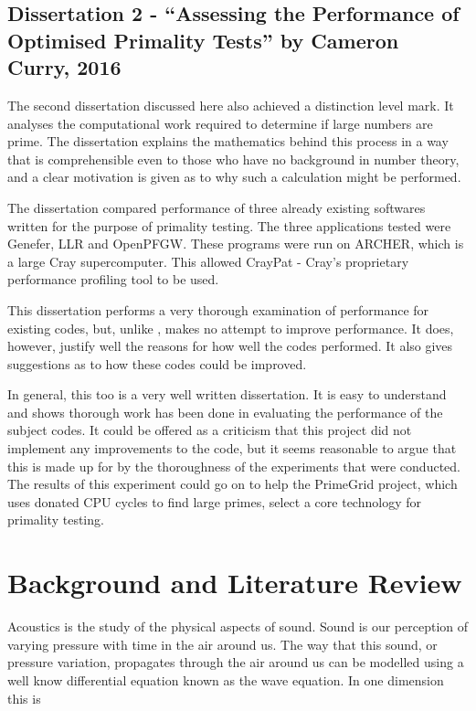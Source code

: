 \documentclass[a4paper,12pt]{article}
\begin{document}
\subsection{Dissertation 2 - ``Assessing the Performance of Optimised
Primality Tests'' by Cameron Curry, 2016}
The second dissertation \cite{dis2} discussed here also achieved a distinction level mark. It analyses the computational work required to determine if large numbers are prime. The dissertation explains the mathematics behind this process in a way that is comprehensible even to those who have no background in number theory, and a clear motivation is given as to why such a calculation might be performed. 

The dissertation compared performance of three already existing softwares written for the purpose of primality testing. The three applications tested were Genefer, LLR and OpenPFGW. These programs were run on ARCHER, which is a large Cray supercomputer. This allowed CrayPat - Cray's proprietary performance profiling tool to be used.

This dissertation performs a very thorough examination of performance for existing codes, but, unlike \cite{dis1}, makes no attempt to improve performance. It does, however, justify well the reasons for how well the codes performed. It also gives suggestions as to how these codes could be improved.

In general, this too is a very well written dissertation. It is easy to understand and shows thorough work has been done in evaluating the performance of the subject codes. It could be offered as a criticism that this project did not implement any improvements to the code, but it seems reasonable to argue that this is made up for by the thoroughness of the experiments that were conducted. The results of this experiment could go on to help the PrimeGrid project, which uses donated CPU cycles to find large primes, select a core technology for primality testing.

\section{Background and Literature Review}
\label{background}
Acoustics is the study of the physical aspects of sound. Sound is our perception of varying pressure with time in the air around us. The way that this sound, or pressure variation, propagates through the air around us can be modelled using a well know differential equation known as the wave equation. In one dimension this is
\end{document}
